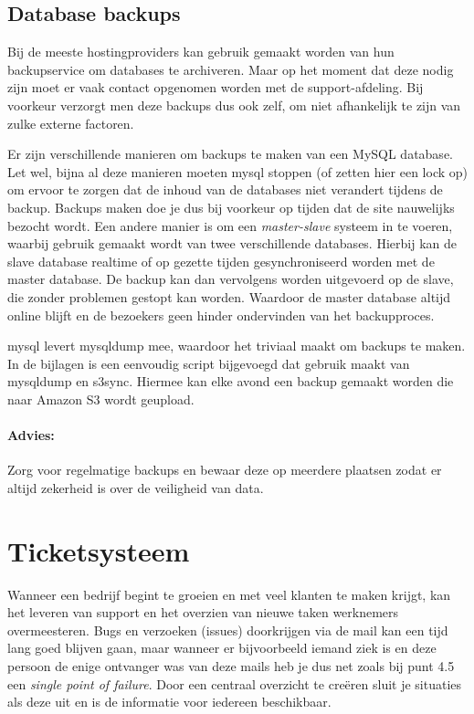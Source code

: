 \subsection{Database backups}

Bij de meeste hostingproviders kan gebruik gemaakt worden van hun backupservice om databases te archiveren. Maar op het moment dat deze nodig zijn moet er vaak contact opgenomen worden met de support-afdeling. Bij voorkeur verzorgt men deze backups dus ook zelf, om niet afhankelijk te zijn van zulke externe factoren.

Er zijn verschillende manieren om backups te maken van een MySQL database. Let wel, bijna al deze manieren moeten {\sc mysql} stoppen (of zetten hier een lock op) om ervoor te zorgen dat de inhoud van de databases niet verandert tijdens de backup. Backups maken doe je dus bij voorkeur op tijden dat de site nauwelijks bezocht wordt. Een andere manier is om een \emph{master-slave} systeem in te voeren, waarbij gebruik gemaakt wordt van twee verschillende databases. Hierbij kan de slave database realtime of op gezette tijden gesynchroniseerd worden met de master database. De backup kan dan vervolgens worden uitgevoerd op de slave, die zonder problemen gestopt kan worden. Waardoor de master database altijd online blijft en de bezoekers geen hinder ondervinden van het backupproces.

{\sc mysql} levert mysqldump mee, waardoor het triviaal maakt om backups te maken. In de bijlagen is een eenvoudig script bijgevoegd dat gebruik maakt van mysqldump en s3sync. Hiermee kan elke avond een backup gemaakt worden die naar Amazon S3 wordt geupload.

\paragraph{Advies:} Zorg voor regelmatige backups en bewaar deze op meerdere plaatsen zodat er altijd zekerheid is over de veiligheid van data.

\section{Ticketsysteem}

Wanneer een bedrijf begint te groeien en met veel klanten te maken krijgt, kan het leveren van support en het overzien van nieuwe taken werknemers overmeesteren. Bugs en verzoeken (issues) doorkrijgen via de mail kan een tijd lang goed blijven gaan, maar wanneer er bijvoorbeeld iemand ziek is en deze persoon de enige ontvanger was van deze mails heb je dus net zoals bij punt 4.5 een \emph{single point of failure}. Door een centraal overzicht te creëren sluit je situaties als deze uit en is de informatie voor iedereen beschikbaar.

